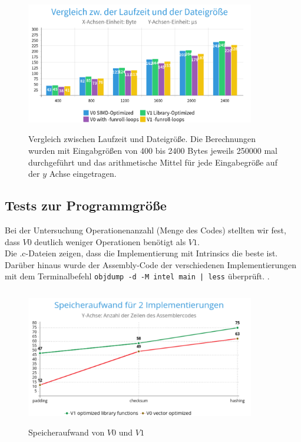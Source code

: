           \begin{figure}[H]
            \label{img:test1}
                  \centering
                  \includegraphics[height=6cm, width=10cm]{pics/4laufzeit.png}
                  \caption{Vergleich zwischen Laufzeit und Dateigröße.
                    Die Berechnungen wurden mit Eingabgrößen von 400 bis 2400 Bytes jeweils 250000 mal
                    durchgeführt und das arithmetische Mittel für jede Eingabegröße auf der $y$ Achse eingetragen.
                    }
              \noindent
          \end{figure}


\subsection{Tests zur Programmgröße}
Bei der Untersuchung Operationenanzahl (Menge des Codes) stellten wir fest,
dass $V0$ deutlich weniger Operationen benötigt als $V1$.
\\
Die .c-Dateien zeigen, dass die Implementierung mit Intrinsics die beste ist.
Darüber hinaus wurde der Assembly-Code der verschiedenen Implementierungen mit dem Terminalbefehl
\texttt{objdump -d -M intel main | less} überprüft. \cite{analyseDesKompiliertenProgramms}.

\begin{figure}[H]
        \centering
        \includegraphics[height=6cm, width=10cm]{pics/SpeicherAufwand.png}
        \caption{Speicheraufwand von $V0$ und $V1$}
        \label{img:test2}
    \noindent
\end{figure}

